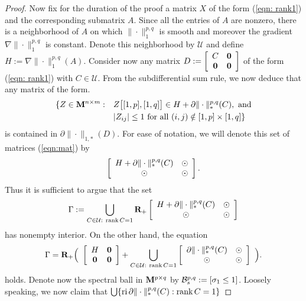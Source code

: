 \documentclass[smallextended,numbook]{svjour3}
\begin{document}
\begin{proof}
Now fix for the duration of the proof a matrix $X$ of the form (\ref{eqn: rank1}) and the corresponding submatrix $A$. Since all the entries of $A$ are nonzero, there is a neighborhood of $A$ on which $\|\cdot\|^{p,q}_{1}$ is smooth and moreover the gradient $\nabla \|\cdot\|^{p,q}_{1}$ is constant. Denote this neighborhood by $\mathcal{U}$ and define $H:=\nabla \|\cdot\|^{p,q}_{1}(A)$. 
Consider now any matrix 
$D:=\left[ \begin{array}{cc}
C & {\bf 0}  \\
{\bf 0} & {\bf 0} \end{array} \right]$
of the form (\ref{eqn: rank1}) with $C\in\mathcal{U}$.
From the subdifferential sum rule, we now deduce that any matrix of the form.
\begin{align}\label{eqn:mat}
\{Z\in {\bf M}^{n\times m}: \quad &Z\big[[1,p],[1,q]\big]\in H +\partial \|\cdot\|^{p,q}_{*}(C), ~\textrm{and} \\
&|Z_{ij}|\leq 1 \textrm{ for all } (i,j)\notin [1,p]\times [1,q]\}\notag
\end{align}
is contained in $\partial \|\cdot\|_{1,*}(D)$. For ease of notation, we will denote this set of matrices (\ref{eqn:mat}) by 
$$\left[ \begin{array}{ccc}
H +\partial \|\cdot\|^{p,q}_{*}(C) & {\bf \odot}  \\
{\bf \odot} & {\bf \odot} \end{array} \right].$$
Thus it is sufficient to argue that the set 
$$\Gamma:=\bigcup_{C\in \mathcal{U}: ~\scriptsize{\mbox{\rm rank}\,} C=1 } {{\bf R}}_+ \left[ \begin{array}{cc}
H +\partial \|\cdot\|^{p,q}_{*}(C) & {\bf \odot}  \\
{\bf \odot} & {\bf \odot} \end{array} \right] $$
has nonempty interior. On the other hand, the equation
\begin{equation*}
\Gamma ={{\bf R}}_+ \Big(~ \left[ \begin{array}{cc}
H & {\bf 0}  \\
{\bf 0} & {\bf 0} \end{array} \right]  + \bigcup_{C\in \mathcal{U}: ~\scriptsize{\mbox{\rm rank}\,} C=1 }  \left[ \begin{array}{cc}
\partial \|\cdot\|^{p,q}_{*}(C) & {\bf \odot}  \\
{\bf \odot} & {\bf \odot} \end{array} \right] ~\Big).
 \end{equation*}
 holds. Denote now the spectral ball in ${\bf M}^{p\times q}$ by  ${{\cal B}}^{p,q}_{s}:=[\sigma_1\leq 1]$. Loosely speaking, we now claim that $\bigcup \{ {\mbox{\rm ri}\,}\partial \|\cdot\|_{*}^{p,q}(C): {\mbox{\rm rank}\,} C=1\}$ 

\end{proof}
\end{document}
